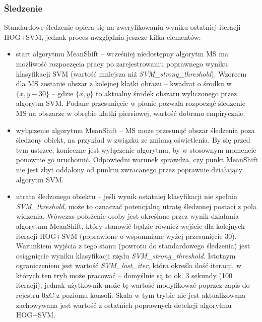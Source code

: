 \subsubsection{Śledzenie}
Standardowe śledzenie opiera się na zweryfikowaniu wyniku ostatniej iteracji HOG+SVM, jednak proces uwzględnia jeszcze kilka elementów:
\begin{itemize}
	\item start algorytmu MeanShift -- wcześniej niedostępny algorytm MS ma możliwość rozpoczęcia pracy po zarejestrowaniu poprawnego wyniku klasyfikacji SVM (wartość mniejsza niż \textit{SVM\_strong\_threshold}). %
	Wzorcem dla MS zostanie obszar z kolejnej klatki obrazu -- kwadrat o środku w $\{x,y-30\}$ -- gdzie $\{x,y\}$ to aktualny środek obszaru wyliczonego przez algorytm SVM. 
	Podane przesunięcie w pionie pozwala rozpocząć śledzenie MS na obszarze w obrębie klatki piersiowej, wartość dobrano empirycznie.
	
	\item wyłączenie algorytmu MeanShift -- MS może przesunąć obszar śledzenia poza śledzony obiekt, na przykład w związku ze zmianą oświetlenia. %
	By się przed tym ustrzec, konieczne jest wyłączenie algorytmu, by w stosownym momencie ponownie go uruchomić. 
	Odpowiedni warunek sprawdza, czy punkt MeanShift nie jest zbyt oddalony od punktu zwracanego przez poprawnie działający algorytm SVM.
	
	\item utrata śledzonego obiektu -- jeśli wynik ostatniej klasyfikacji nie spełnia \textit{SVM\_threshold}, może to oznaczać potencjalną utratę śledzonej postaci z pola widzenia. 
	Wówczas położenie osoby jest określane przez wynik działania algorytmu MeanShift, który stanowić będzie również wejście dla kolejnych iteracji HOG+SVM (poprawione o wspomniane wyżej przesunięcie $30$). %
	Warunkiem wyjścia z tego stanu (powrotu do standardowego śledzenia) jest osiągnięcie wyniku klasyfikacji rzędu \textit{SVM\_strong\_threshold}.
	Istotnym ograniczeniem jest wartość \textit{SVM\_lost\_iter}, która określa ilość iteracji, w których ten tryb może pracować -- domyślnie są to ok. 3 sekundy (100 iteracji), jednak użytkownik może tę wartość modyfikować poprzez zapis do rejestru 0xC z poziomu konsoli. %
	Skala w tym trybie nie jest aktualizowana -- zachowywana jest wartość z ostatnich poprawnych detekcji algorytmu HOG+SVM. %
\end{itemize} 

